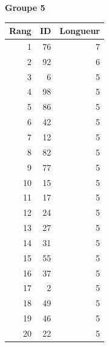 \documentclass[10pt]{article}
\begin{document}
\hfill
 \begin{minipage}[t]{0.31\textwidth}
\centering
\small
\textbf{Groupe 5}\\[-0.25em]
\begin{tabular}{@{}r r r@{}}
\toprule
Rang & ID & Longueur \\
\midrule
1 & 76 & 7 \\
2 & 92 & 6 \\
3 & 6 & 5 \\
4 & 98 & 5 \\
5 & 86 & 5 \\
6 & 42 & 5 \\
7 & 12 & 5 \\
8 & 82 & 5 \\
9 & 77 & 5 \\
10 & 15 & 5 \\
11 & 17 & 5 \\
12 & 24 & 5 \\
13 & 27 & 5 \\
14 & 31 & 5 \\
15 & 55 & 5 \\
16 & 37 & 5 \\
17 & 2 & 5 \\
18 & 49 & 5 \\
19 & 46 & 5 \\
20 & 22 & 5 \\
\bottomrule
\end{tabular}
\end{minipage}
\end{document}
